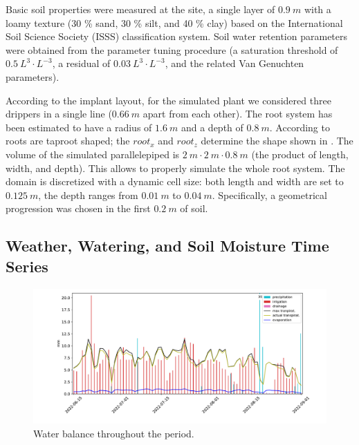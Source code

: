 Basic soil properties were measured at the site, a single layer of $0.9~m$ with a loamy texture (30 \% sand, 30 \% silt, and 40 \% clay) based on the International Soil Science Society (ISSS) classification system. 
Soil water retention parameters were obtained from the parameter tuning procedure (a saturation threshold of $0.5~L^3 \cdot L^{-3}$, a residual of $0.03~L^3 \cdot L^{-3}$, and the related Van Genuchten parameters).

According to the implant layout, for the simulated plant we considered three drippers in a single line ($0.66~m$ apart from each other). 
The root system has been estimated to have a radius of $1.6~m$ and a depth of $0.8~m$. According to  roots are taproot shaped; the $root_x$ and $root_z$ determine the shape shown in . The volume of the simulated parallelepiped is $2~m\cdot2~m\cdot0.8~m$ (the product of length, width, and depth).
This allows to properly simulate the whole root system.
The domain is discretized with a dynamic cell size: both length and width are set to $0.125~m$, the depth ranges from $0.01~m$ to $0.04~m$.
Specifically, a geometrical progression was chosen in the first $0.2~m$ of soil.


\subsection{Weather, Watering, and Soil Moisture Time Series}
\label{orchard-sec:time_series}

\begin{figure}[t]
    \centering
    \includegraphics[scale=.45]{chapters/physics-aware/orchard/img/water_balance.pdf}
    \caption{Water balance throughout the period.}
    \label{orchard-fig:water_balance}
\end{figure}

